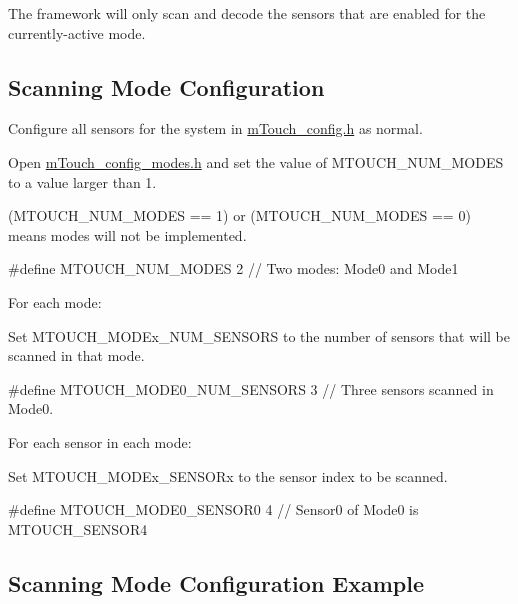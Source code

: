 The framework will only scan and decode the sensors that are enabled for the currently-\/active mode.\hypertarget{feat_mode_featMode-Config}{}\subsection{Scanning Mode Configuration}\label{feat_mode_featMode-Config}

\begin{DoxyEnumerate}
\item Configure all sensors for the system in \hyperlink{m_touch__config_8h}{m\+Touch\+\_\+config.\+h} as normal. 
\item Open \hyperlink{m_touch__config__modes_8h}{m\+Touch\+\_\+config\+\_\+modes.\+h} and set the value of M\+T\+O\+U\+C\+H\+\_\+\+N\+U\+M\+\_\+\+M\+O\+D\+E\+S to a value larger than 1. 
\begin{DoxyItemize}
\item (M\+T\+O\+U\+C\+H\+\_\+\+N\+U\+M\+\_\+\+M\+O\+D\+E\+S == 1) or (M\+T\+O\+U\+C\+H\+\_\+\+N\+U\+M\+\_\+\+M\+O\+D\+E\+S == 0) means \textquotesingle{}modes\textquotesingle{} will not be implemented. 
\end{DoxyItemize}
\begin{DoxyCode}
\textcolor{preprocessor}{#define MTOUCH\_NUM\_MODES                    2   // Two modes: Mode0 and Mode1}
\end{DoxyCode}
 
\item For each mode\+: 
\begin{DoxyItemize}
\item Set M\+T\+O\+U\+C\+H\+\_\+\+M\+O\+D\+Ex\+\_\+\+N\+U\+M\+\_\+\+S\+E\+N\+S\+O\+R\+S to the number of sensors that will be scanned in that mode. 
\begin{DoxyCode}
\textcolor{preprocessor}{#define MTOUCH\_MODE0\_NUM\_SENSORS      3   // Three sensors scanned in Mode0.}
\end{DoxyCode}
 
\item For each sensor in each mode\+: 
\begin{DoxyItemize}
\item Set M\+T\+O\+U\+C\+H\+\_\+\+M\+O\+D\+Ex\+\_\+\+S\+E\+N\+S\+O\+Rx to the sensor index to be scanned. 
\begin{DoxyCode}
\textcolor{preprocessor}{#define MTOUCH\_MODE0\_SENSOR0    4   // Sensor0 of Mode0 is MTOUCH\_SENSOR4}
\end{DoxyCode}
 
\end{DoxyItemize}
\end{DoxyItemize}
\end{DoxyEnumerate}\hypertarget{feat_mode_featMode-Ex}{}\subsection{Scanning Mode Configuration Example}\label{feat_mode_featMode-Ex}

